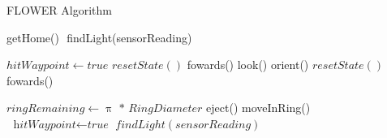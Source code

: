 \documentclass{article}
\begin{document}
\begin{algorithm}
\caption{FLOWER Algorithm}\label{euclid}
\begin{algorithmic}[1]
 \Return getHome()
\Else $ $ \Return findLight(sensorReading)

\EndIf
\EndProcedure


\State $hitWaypoint \gets \textit{true}$
\State $resetState()$
\EndIf
\State \Return fowards()
  \Return look()
 \Return orient()
\Else 
\State $resetState()$
\State \Return fowards()
\EndIf
\EndProcedure

\State $ringRemaining \gets \uppi \textit{ * RingDiameter}$
\EndIf
{} \Return eject()
\Return moveInRing()
\Else 
\State $\textit{ hitWaypoint} \gets \textit{true}$
\State \Return $ findLight(sensorReading)$
\EndIf
\EndProcedure

\end{algorithmic}
\end{algorithm}
\end{document}
